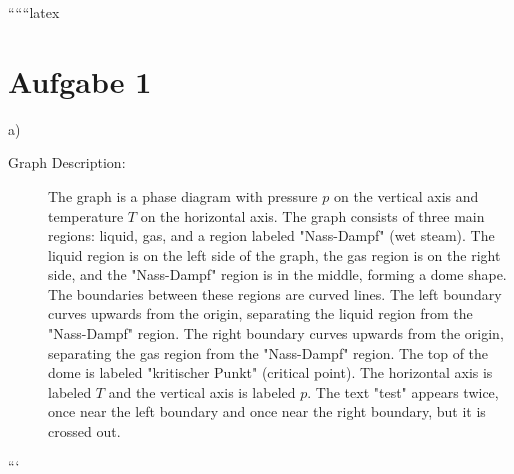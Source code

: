 
``````latex


\section*{Aufgabe 1}

a) 

\begin{description}
    \item[Graph Description:] The graph is a phase diagram with pressure \( p \) on the vertical axis and temperature \( T \) on the horizontal axis. The graph consists of three main regions: liquid, gas, and a region labeled "Nass-Dampf" (wet steam). The liquid region is on the left side of the graph, the gas region is on the right side, and the "Nass-Dampf" region is in the middle, forming a dome shape. The boundaries between these regions are curved lines. The left boundary curves upwards from the origin, separating the liquid region from the "Nass-Dampf" region. The right boundary curves upwards from the origin, separating the gas region from the "Nass-Dampf" region. The top of the dome is labeled "kritischer Punkt" (critical point). The horizontal axis is labeled \( T \) and the vertical axis is labeled \( p \). The text "test" appears twice, once near the left boundary and once near the right boundary, but it is crossed out.
\end{description}

```